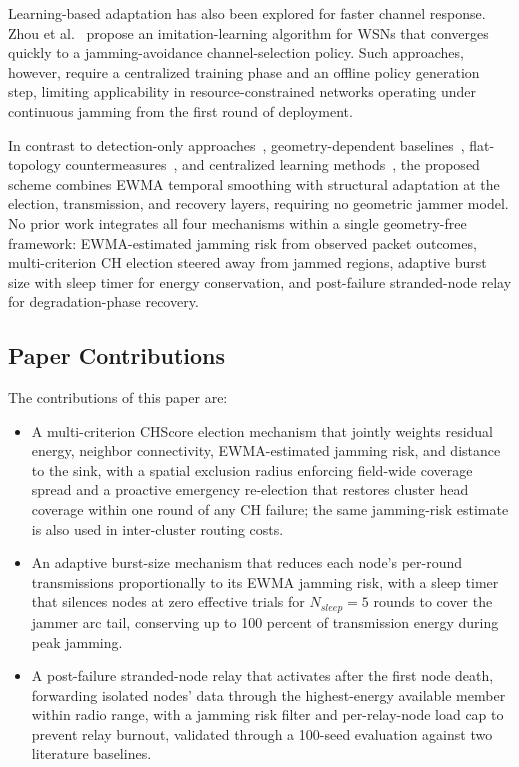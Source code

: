 \documentclass[conference]{IEEEtran}
\begin{document}
Learning-based adaptation has also been explored for faster channel
response. Zhou et al.~\cite{Zhou2023} propose an imitation-learning
algorithm for WSNs that converges quickly to a jamming-avoidance
channel-selection policy. Such approaches, however, require a
centralized training phase and an offline policy generation step,
limiting applicability in resource-constrained networks operating under
continuous jamming from the first round of deployment.

In contrast to detection-only
approaches~\cite{DelValleSoto2021,9915936}, geometry-dependent
baselines~\cite{s23156894}, flat-topology
countermeasures~\cite{11156845}, and centralized learning
methods~\cite{Zhou2023}, the proposed scheme combines EWMA temporal
smoothing with structural adaptation at the election, transmission,
and recovery layers, requiring no geometric jammer model. No prior
work integrates all four mechanisms within a single geometry-free
framework: EWMA-estimated jamming risk from observed packet outcomes,
multi-criterion CH election steered away from jammed regions, adaptive
burst size with sleep timer for energy conservation, and post-failure
stranded-node relay for degradation-phase recovery.

\subsection{Paper Contributions}

The contributions of this paper are:
\begin{itemize}
    \item A multi-criterion CHScore election mechanism that jointly
    weights residual energy, neighbor connectivity, EWMA-estimated
    jamming risk, and distance to the sink, with a spatial exclusion
    radius enforcing field-wide coverage spread and a proactive emergency
    re-election that restores cluster head coverage within one round of
    any CH failure; the same jamming-risk estimate is also used in
    inter-cluster routing costs.
    \item An adaptive burst-size mechanism that reduces each node's
    per-round transmissions proportionally to its EWMA jamming risk,
    with a sleep timer that silences nodes at zero effective trials for
    $N_{sleep}=5$ rounds to cover the jammer arc tail, conserving up to
    100 percent of transmission energy during peak jamming.
    \item A post-failure stranded-node relay that activates after the
    first node death, forwarding isolated nodes' data through the
    highest-energy available member within radio range, with a jamming
    risk filter and per-relay-node load cap to prevent relay burnout,
    validated through a 100-seed evaluation against two literature
    baselines.
\end{itemize}
\end{document}

